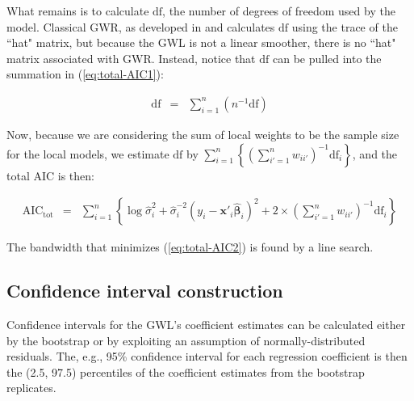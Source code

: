 \documentclass[authoryear, review, 11pt]{elsarticle}
\begin{document}
	What remains is to calculate $\mbox{df}$, the number of degrees of freedom used by the model. Classical GWR, as developed in \cite{Loader:1999} and \cite{Fotheringham:2002} calculates $\mbox{df}$ using the trace of the ``hat" matrix, but because the GWL is not a linear smoother, there is no ``hat" matrix associated with GWR. Instead, notice that $\mbox{df}$ can be pulled into the summation in (\ref{eq:total-AIC1}):
		
			
	\begin{eqnarray}
		\mbox{df} &=& \sum_{i=1}^n \left( n^{-1} \mbox{df} \right)
	\end{eqnarray}
	
	Now, because we are considering the sum of local weights to be the sample size for the local models, we estimate $\mbox{df}$ by $\sum_{i=1}^n \left\{ \left(\sum_{i'=1}^n w_{ii'} \right)^{-1} \mbox{df}_i \right\}$, and the total AIC is then:
	
	\begin{eqnarray}\label{eq:total-AIC2}
		\mbox{AIC}_{\mbox{tot}} &=& \sum_{i=1}^n \left\{ \log \hat{\sigma}_i^2 + \hat{\sigma}_i^{-2} \left(y_i - \bm{x}'_i \hat{\bm{\beta}}_i \right)^2 + 2 \times \left(\sum_{i'=1}^n w_{ii'} \right)^{-1} \mbox{df}_i \right\}
	\end{eqnarray}
			
	The bandwidth that minimizes (\ref{eq:total-AIC2}) is found by a line search.\\
	
	\subsection{Confidence interval construction}	
	Confidence intervals for the GWL's coefficient estimates can be calculated either by the bootstrap \citep{Efron:1986} or by exploiting an assumption of normally-distributed residuals. The, e.g., 95\% confidence interval for each regression coefficient is then the (2.5, 97.5) percentiles of the coefficient estimates from the bootstrap replicates.\\
	 
\end{document}
